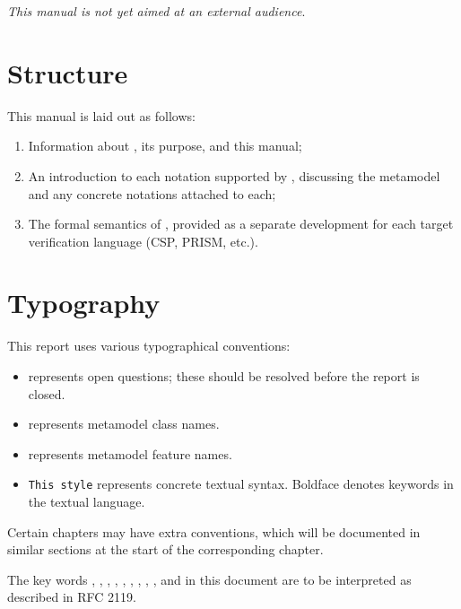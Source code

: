 
\emph{This manual is not yet aimed at an external audience}.

\section*{Structure}
This manual is laid out as follows:

\begin{enumerate}
\item
  Information about \langname, its purpose, and this manual;
\item
  An introduction to each notation supported by \langname, discussing the
  metamodel and any concrete notations attached to each;
\item
  The formal semantics of \langname, provided as a separate development for
  each target verification language (CSP, PRISM, etc.).
\end{enumerate}

\section*{Typography}
This report uses various typographical conventions:

\begin{itemize}
\item
	 represents open questions; these should be
	resolved before the report is closed.
\item
	 represents metamodel class names.
\item
	 represents metamodel feature names.
\item
	\texttt{This style} represents concrete textual syntax.  Boldface
	denotes keywords in the textual language.
\end{itemize}

Certain chapters may have extra conventions, which will be documented in
similar sections at the start of the corresponding chapter.

The key words \rfcmust, \rfcmustnot, \rfcrequired, \rfcshall, \rfcshallnot,
\rfcshould, \rfcshouldnot, \rfcrecommended, \rfcmay, and \rfcoptional{} in this
document are to be interpreted as described in RFC 2119.

